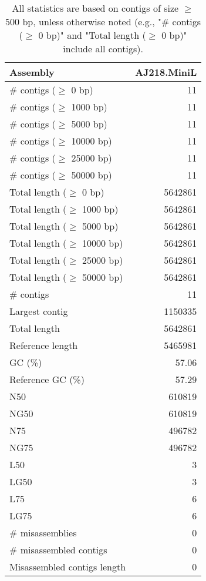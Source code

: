 \documentclass[12pt,a4paper]{article}
\begin{document}
\begin{table}[ht]
\begin{center}
\caption{All statistics are based on contigs of size $\geq$ 500 bp, unless otherwise noted (e.g., "\# contigs ($\geq$ 0 bp)" and "Total length ($\geq$ 0 bp)" include all contigs).}
\begin{tabular}{|l*{1}{|r}|}
\hline
Assembly & AJ218.MiniL \\ \hline
\# contigs ($\geq$ 0 bp) & 11 \\ \hline
\# contigs ($\geq$ 1000 bp) & 11 \\ \hline
\# contigs ($\geq$ 5000 bp) & 11 \\ \hline
\# contigs ($\geq$ 10000 bp) & 11 \\ \hline
\# contigs ($\geq$ 25000 bp) & 11 \\ \hline
\# contigs ($\geq$ 50000 bp) & 11 \\ \hline
Total length ($\geq$ 0 bp) & 5642861 \\ \hline
Total length ($\geq$ 1000 bp) & 5642861 \\ \hline
Total length ($\geq$ 5000 bp) & 5642861 \\ \hline
Total length ($\geq$ 10000 bp) & 5642861 \\ \hline
Total length ($\geq$ 25000 bp) & 5642861 \\ \hline
Total length ($\geq$ 50000 bp) & 5642861 \\ \hline
\# contigs & 11 \\ \hline
Largest contig & 1150335 \\ \hline
Total length & 5642861 \\ \hline
Reference length & 5465981 \\ \hline
GC (\%) & 57.06 \\ \hline
Reference GC (\%) & 57.29 \\ \hline
N50 & 610819 \\ \hline
NG50 & 610819 \\ \hline
N75 & 496782 \\ \hline
NG75 & 496782 \\ \hline
L50 & 3 \\ \hline
LG50 & 3 \\ \hline
L75 & 6 \\ \hline
LG75 & 6 \\ \hline
\# misassemblies & 0 \\ \hline
\# misassembled contigs & 0 \\ \hline
Misassembled contigs length & 0 \\ \hline

\end{tabular}
\end{center}
\end{table}
\end{document}

